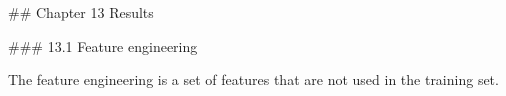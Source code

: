 

## Chapter 13 Results

### 13.1 Feature engineering

The feature engineering is a set of features that are not used in the training set.

